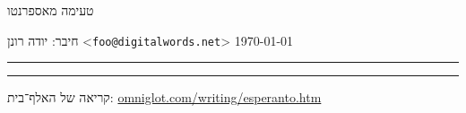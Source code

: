 



{
	\sectionfont\LARGE\color{inkC}
טעימה מאספרנטו
\hfill
{}

\normalsize
חיבר: יודה רונן <\texttt{foo@digitalwords.net}> \hfill \csdate\today

\color{inkB}
\vskip2pt\hrule\vskip2pt\hrule
}




קריאה של האלף־בית: \url{omniglot.com/writing/esperanto.htm}

\begin{center}
	\setLR
	\\
\end{center}




